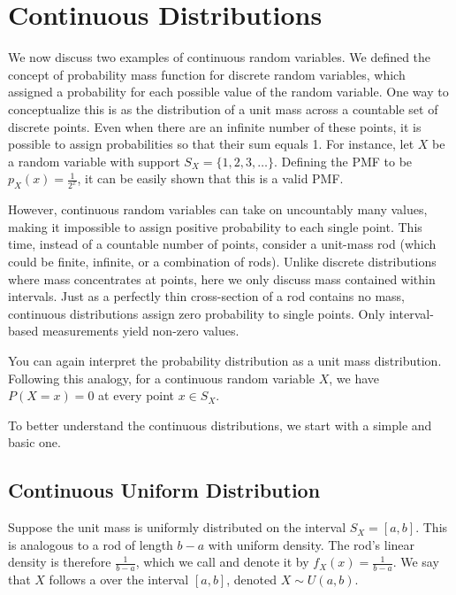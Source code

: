 \section{Continuous Distributions}

We now discuss two examples of continuous random variables.
We defined the concept of probability mass function for discrete random variables,
which assigned a probability for each possible value of the random variable.
One way to conceptualize this is as the distribution of a unit mass across a countable set of discrete points.
Even when there are an infinite number of these points,
it is possible to assign probabilities so that their sum equals 1.
For instance, let \( X \) be a random variable with support \( S_{X} = \{ 1, 2, 3, \ldots \} \).
Defining the PMF to be \( p_{X}(x) = \frac{1}{2^x} \),
it can be easily shown that this is a valid PMF.

However, continuous random variables can take on uncountably many values,
making it impossible to assign positive probability to each single point.
This time, instead of a countable number of points, consider a unit-mass rod (which could be finite, infinite, or a combination of rods). 
Unlike discrete distributions where mass concentrates at points, here we only discuss mass contained within intervals.
Just as a perfectly thin cross-section of a rod contains no mass, continuous distributions assign zero probability to single points.
Only interval-based measurements yield non-zero values.

You can again interpret the probability distribution as a unit mass distribution.
Following this analogy, for a continuous random variable \( X \),
we have \( P(X = x) = 0 \) at every point \( x \in S_{X} \).

To better understand the continuous distributions, we start with a simple and basic one.

\subsection{Continuous Uniform Distribution}

Suppose the unit mass is uniformly distributed on the interval \( S_{X} = [a, b] \).
This is analogous to a rod of length \( b - a \) with uniform density.
The rod's linear density is therefore \( \frac{1}{b - a} \),
which we call  and denote it by \( f_{X}(x) = \frac{1}{b - a} \).
We say that \( X \) follows a  over the interval \( [a, b] \), denoted \( X \sim U(a, b) \).

